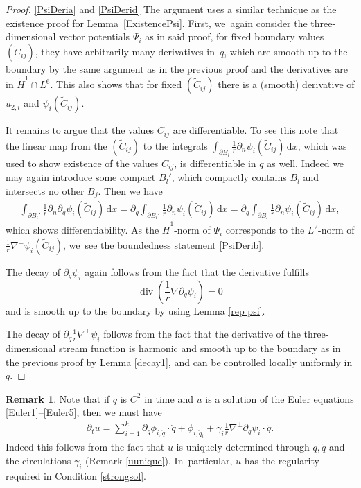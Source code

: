 \documentclass[10pt]{amsart}
\newcommand{\skpt}{\par\smallskip\noindent}
\theoremstyle{definition}
\newtheorem{remark}[theorem]{Remark}
\renewcommand{\div}{\operatorname{div}}
\newcommand\eq{=}
\newcommand\dd{\,\mathrm{d}}
\newcommand\dx{\dd x}
\let\de\partial
\begin{document}
\skpt
\begin{proof}

\eqref{PsiDeria} and \eqref{PsiDerid} The argument uses a similar technique as the existence proof for Lem\-ma~\ref{ExistencePsi}. First, we~again consider the three-dimensional vector potentials $\Psi_i$ as in said proof, for fixed boundary values $(\tilde{C}_{ij})$, they have arbitrarily many derivatives in~$q$, which are smooth up to the boundary by the same argument as in the previous proof and the derivatives are in $\dot{H}^1\cap L^6$. This also shows that for fixed $(\tilde{C}_{ij})$ there is a (smooth) derivative of $u_{2,i}$ and $\psi_{i}(\tilde{C}_{ij})$.

It remains to argue that the values $C_{ij}$ are differentiable. To see this note that the linear map from the $(\tilde{C}_{ij})$ to the integrals $\int_{\de B_l}\frac{1}{r}\de_n\psi_i(\tilde{C}_{ij})\dx$, which was used to show existence of the values $C_{ij}$, is differentiable in $q$ as well. Indeed we may again introduce some compact $B_l'$, which compactly contains $B_l$ and intersects no other $B_{j}$. Then we have
\begin{align*}
\int_{\de B_l'}\frac{1}{r}\de_n\de_q\psi_i(\tilde{C}_{ij})\dx\eq\de_q\int_{\de B_l'}\frac{1}{r}\de_n\psi_i(\tilde{C}_{ij})\dx\eq\de_q \int_{\de B_l}\frac{1}{r}\de_n\psi_i(\tilde{C}_{ij})\dx,
\end{align*}
which shows differentiability.
As the $\dot{H}^1$-norm of $\Psi_i$ corresponds to the $L^2$-norm of $\frac{1}{r}\nabla^\perp\psi_i(\tilde{C}_{ij})$, we~see the boundedness statement \eqref{PsiDerib}.

The decay of $\de_q\psi_i$ again follows from the fact that the derivative fulfills
\begin{equation*}\div(\frac{1}{r}\nabla\de_q\psi_i)=0\end{equation*} and is smooth up to the boundary by using Lemma \ref{rep psi}.

The decay of $\de_q \frac{1}{r}\nabla^\perp\psi_i$ follows from the fact that the derivative of the three-dimensional stream function is harmonic and smooth up to the boundary as in the previous proof by Lemma \ref{decay1}, and can be controlled locally uniformly in $q$.
\end{proof}

\begin{remark}
Note that if $q$ is $C^2$ in time and $u$ is a solution of the Euler equations \eqref{Euler1}--\eqref{Euler5}, then we must have
\begin{align}\label{eqDu}
\de_t u\eq \sum_{i=1}^k\de_q \phi_{i,\dot{q}}\cdot\dot{q}+\phi_{i,\ddot{q}_i}+\gamma_i\frac{1}{r}\nabla^\perp\de_q\psi_i\cdot \dot{q}.
\end{align}
Indeed this follows from the fact that $u$ is uniquely determined through $q,\dot{q}$ and the circulations $\gamma_i$ (Remark \ref{uunique}). In~particular, $u$ has the regularity required in Condition \ref{strongsol}.

\end{remark}
\end{document}
